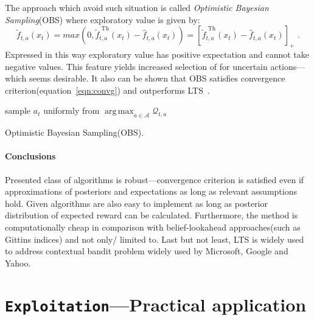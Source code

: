 \documentclass[12pt, a4paper, pdflatex, leqno]{report}
\begin{document}
The approach which avoid such situation is called \emph{Optimistic Bayesian Sampling}(OBS) where exploratory value is given by:
$$
  \tilde{f}_{t,a} (x_t) = max \left( 0, \tilde{f}_{t,a}^{\text{ Th}} (x_t) - \hat{f}_{t,a}(x_t) \right)
                        = \left [ \tilde{f}_{t,a}^{\text{ Th}} (x_t) - \hat{f}_{t,a}(x_t) \right]_+
                        \text{ .}
$$
Expressed in this way exploratory value has positive expectation and cannot take negative values. This feature yields increased selection of for uncertain actions---which seems desirable. It also can be shown that OBS satisfies convergence criterion(equation~\ref{eqn:convg}) and outperforms LTS~\citep{May:2012:OBS:2503308.2343711}.\\

\vspace{2cm}
\begin{algorithm}[H]
  sample $a_t$ uniformly from $\operatorname{arg\,max}_{a \in \mathscr{A}} \mathscr{Q}_{t,a}$ \;
 \caption{Optimistic Bayesian Sampling(OBS).\label{al:OBS}}
\end{algorithm}
\vspace{2cm}

\subsubsection{Conclusions}
Presented class of algorithms is robust---convergence criterion is satisfied even if approximations of posteriors and expectations as long as relevant assumptions hold. Given algorithms are also easy to implement as long as posterior distribution of expected reward can be calculated. Furthermore, the method is computationally cheap in comparison with belief-lookahead approaches(such as Gittins indices) and not only/ limited to. Last but not least, LTS is widely used to address contextual bandit problem widely used by Microsoft, Google and Yahoo.\\




\chapter{\texttt{\textbf{Exploitation}}---Practical application\label{ch:MAB-AL}}
\end{document}
